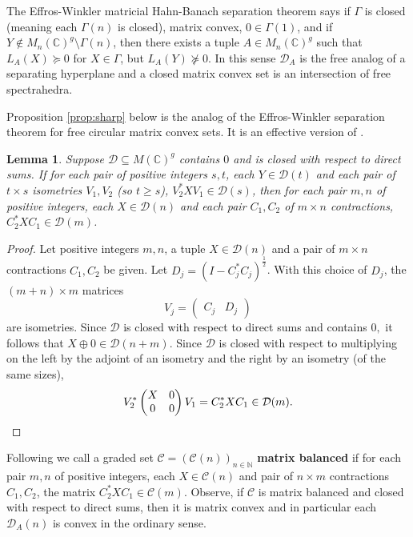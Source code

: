 \documentclass[12pt,makeidx]{amsart}
\renewcommand{\subset}{\subseteq}
\newtheorem{lemma}[theorem]{Lemma}
\numberwithin{equation}{section}
\def\cD{ {{\mathcal D}}}
\def\bbF{ {\mathbb C}}
\def\N{ {\mathbb{N}} }
\def\cC{ {\mathcal C} }
\def\cD{ {\mathcal D} }
\newcommand{\df}[1]{{\bf{#1}}{\index{#1}}}
\def\Cr{C_1}
\def\Cl{C_2}
\begin{document}
The  Effros-Winkler  matricial Hahn-Banach separation theorem \cite{EW} says if $\Gamma$ is closed (meaning each $\Gamma(n)$ is closed), matrix convex,  $0\in \Gamma(1)$,  and if $Y\notin M_n(\bbF)^g \setminus \Gamma(n)$, then there exists a tuple $A\in M_n(\bbF)^g$ such that  $L_A(X)\succeq 0$ for $X\in\Gamma$, but $L_A(Y)\not\succeq 0$. In this sense $\cD_A$ is the free analog of a separating hyperplane and a  closed matrix convex set is an intersection of free spectrahedra. 

Proposition \ref{prop:sharp} below is the analog of the Effros-Winkler separation theorem
for free circular matrix convex sets.
It is an effective version of \cite[Proposition 3.5]{BVM}.


\begin{lemma}
\label{lem:VXV}
 Suppose $\cD \subset  M(\bbF)^g$ contains $0$ and is closed with respect to direct sums. If for each pair of positive integers $s,t$, each $Y\in\cD(t)$ and each pair of $t\times s$  isometries $V_1,V_2$ (so $t\ge s$),  $V_2^* X V_1 \in \cD(s)$, then for each pair $m,n$ of positive integers, each $X\in\cD(n)$ and each pair $C_1,C_2$ of $m\times n$ contractions,   $\Cl^* X \Cr\in \cD(m)$.
\end{lemma}

\begin{proof}
Let positive integers $m,n$, a tuple $X\in\cD(n)$ and a pair of $m\times n$ contractions $C_1,C_2$ be given.
 Let $D_j=(I-C_j^*C_j)^{\frac 12}$.  With this choice of $D_j$, the $(m+n)\times m$ matrices
\[
 V_j =\begin{pmatrix} C_j & D_j \end{pmatrix}
\]
 are isometries.  Since $\cD$ is closed with respect to direct sums and contains $0,$ it follows that  $X\oplus 0\in \cD(n+m).$ Since $\cD$ is closed with respect to multiplying on the left by the adjoint of an isometry and the right by an isometry (of the same sizes), 
\[
  V_2^* \begin{pmatrix} X & 0 \\ 0 & 0 \end{pmatrix} V_1 =  \Cl^* X \Cr \in \cD(m). \qedhere
\]
\end{proof}

Following \cite{BVM} we call 
a graded set $\cC=(\cC(n))_{n\in\N}$  \df{matrix balanced} 
if for each pair $m,n$ of positive integers, each  $X\in \cC(n)$ and  pair of $n\times m$ contractions $C_1,C_2$, the matrix $\Cl^* X \Cr \in \cC(m)$. 
Observe, if $\cC$ is matrix balanced and closed with respect to direct sums, then it is matrix convex and in particular each $\cD_A(n)$ is convex 
in the ordinary sense.
\end{document}
